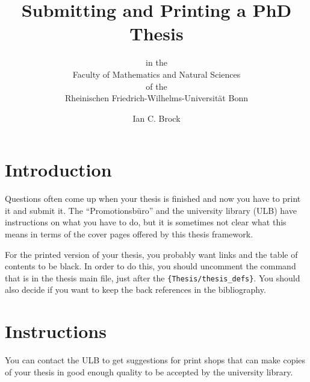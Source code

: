 \documentclass[a4paper, twoside, ngerman, UKenglish]{scrartcl}
\begin{document}
\title{Submitting and Printing a PhD Thesis}
\subtitle{\vspace*{4ex}
    in the\\
    Faculty of Mathematics and Natural Sciences\\
    of the\\
    Rheinischen Friedrich-Wilhelms-Universität Bonn
}
\author{Ian C. Brock}
\maketitle

\section{Introduction}
Questions often come up when your thesis is finished and now you have
to print it and submit it. The \foreignquote{ngerman}{Promotionsbüro}
and the university library (ULB) have instructions on what you have to
do, but it is sometimes not clear what this means in terms of the
cover pages offered by this thesis framework.

For the printed version of your thesis, you probably want
 links and the table of contents to be black. In
order to do this, you should uncomment the  command
that is in the thesis main file, just after the
\texttt{\{Thesis/thesis\_defs\}}.
You should also decide if you want to keep the back references in the bibliography.

\section{Instructions}


You can contact the ULB to get suggestions for print
shops that can make copies of your thesis in good enough quality to be
accepted by the university library.
\end{document}

